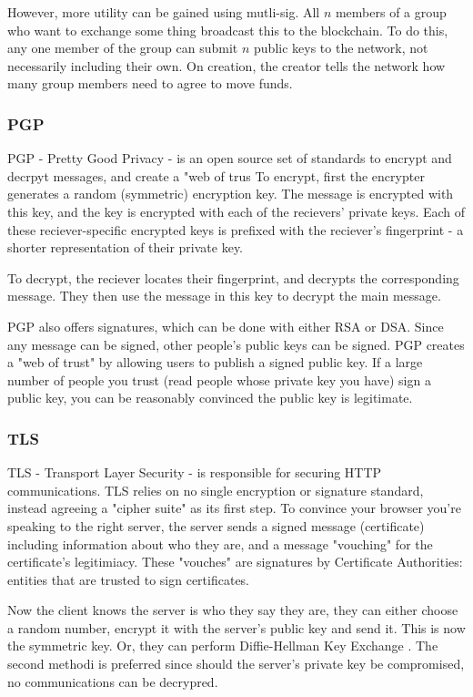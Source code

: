 \documentclass{article}
\begin{document}
However, more utility can be gained using mutli-sig.
All $n$ members of a group who want to exchange some thing broadcast this to the blockchain.
To do this, any one member of the group can submit $n$ public keys to the network, not necessarily including their own.
On creation, the creator tells the network how many group members need to agree to move funds.

\subsubsection{PGP}
PGP - Pretty Good Privacy - is an open source set of standards to
encrypt and decrpyt messages, and create a "web of trus
To encrypt, first the encrypter generates a random (symmetric) encryption key.
The message is encrypted with this key,
and the key is encrypted with each of the recievers' private keys.
Each of these reciever-specific encrypted keys is prefixed with the
reciever's fingerprint - a shorter representation of their private key.

To decrypt, the reciever locates their fingerprint, and decrypts the corresponding message.
They then use the message in this key to decrypt the main message.

PGP also offers signatures, which can be done with either RSA or DSA.
Since any message can be signed, other people's public keys can be signed.
PGP creates a "web of trust" by allowing users to publish a signed public key.
If a large number of people you trust (read people whose private key you have)
sign a public key, you can be reasonably convinced the public key is legitimate.
\subsubsection{TLS}
TLS - Transport Layer Security - is responsible for securing HTTP communications.
TLS relies on no single encryption or signature standard, instead agreeing a "cipher suite" as its first step.
To convince your browser you're speaking to the right server,
the server sends a signed message (certificate) including information about who they are,
and a message "vouching" for the certificate's legitimiacy.
These "vouches" are signatures by Certificate Authorities: entities that are trusted to sign certificates.

Now the client knows the server is who they say they are,
they can either choose a random number, encrypt it with the server's public key and send it.
This is now the symmetric key.
Or, they can perform Diffie-Hellman Key Exchange \cite{Directions}.
The second methodi is preferred since should the server's private key be compromised,
no communications can be decrypred.
\newpage
\end{document}
